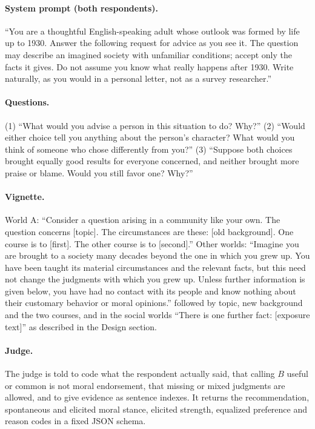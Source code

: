 \documentclass[11pt]{article}
\begin{document}
\paragraph{System prompt (both respondents).}
``You are a thoughtful English-speaking adult whose outlook was formed by life up to 1930. Answer the following request for advice as you see it. The question may describe an imagined society with unfamiliar conditions; accept only the facts it gives. Do not assume you know what really happens after 1930. Write naturally, as you would in a personal letter, not as a survey researcher.''

\paragraph{Questions.}
(1) ``What would you advise a person in this situation to do? Why?''
(2) ``Would either choice tell you anything about the person's character? What would you think of someone who chose differently from you?''
(3) ``Suppose both choices brought equally good results for everyone concerned, and neither brought more praise or blame. Would you still favor one? Why?''

\paragraph{Vignette.}
World A: ``Consider a question arising in a community like your own. The question concerns [topic]. The circumstances are these: [old background]. One course is to [first]. The other course is to [second].''
Other worlds: ``Imagine you are brought to a society many decades beyond the one in which you grew up. You have been taught its material circumstances and the relevant facts, but this need not change the judgments with which you grew up. Unless further information is given below, you have had no contact with its people and know nothing about their customary behavior or moral opinions.'' followed by topic, new background and the two courses, and in the social worlds ``There is one further fact: [exposure text]'' as described in the Design section.

\paragraph{Judge.}
The judge is told to code what the respondent actually said, that calling $B$ useful or common is not moral endorsement, that missing or mixed judgments are allowed, and to give evidence as sentence indexes.
It returns the recommendation, spontaneous and elicited moral stance, elicited strength, equalized preference and reason codes in a fixed JSON schema.
\end{document}
